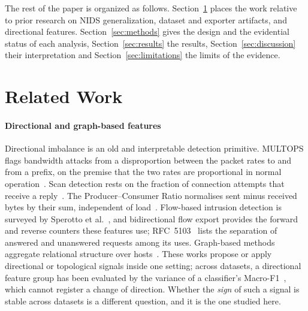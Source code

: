 \documentclass[preprint,12pt]{elsarticle}
\begin{document}
The rest of the paper is organized as follows. Section~\ref{sec:related} places the work relative to prior research on NIDS generalization, dataset and exporter artifacts, and directional features. Section~\ref{sec:methods} gives the design and the evidential status of each analysis, Section~\ref{sec:results} the results, Section~\ref{sec:discussion} their interpretation and Section~\ref{sec:limitations} the limits of the evidence.

\section{Related Work}\label{sec:related}

\paragraph{Directional and graph-based features} Directional imbalance is an old and interpretable detection primitive. MULTOPS flags bandwidth attacks from a disproportion between the packet rates to and from a prefix, on the premise that the two rates are proportional in normal operation~\cite{gil2001multops}. Scan detection rests on the fraction of connection attempts that receive a reply~\cite{jung2004portscan}. The Producer--Consumer Ratio normalises sent minus received bytes by their sum, independent of load~\cite{bullard2014pcr}. Flow-based intrusion detection is surveyed by Sperotto et al.~\cite{sperotto2010overview}, and bidirectional flow export provides the forward and reverse counters these features use; RFC~5103~\cite{rfc5103} lists the separation of answered and unanswered requests among its uses. Graph-based methods aggregate relational structure over hosts~\cite{akoglu2015graph,zhong2024gnnids}. These works propose or apply directional or topological signals inside one setting; across datasets, a directional feature group has been evaluated by the variance of a classifier's Macro-F1~\cite{elangovan2026crossdataset}, which cannot register a change of direction. Whether the \emph{sign} of such a signal is stable across datasets is a different question, and it is the one studied here.
\end{document}
